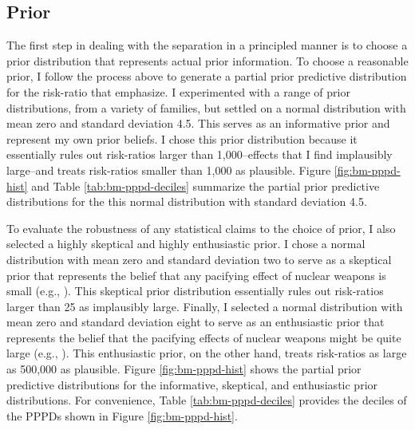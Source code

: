 \documentclass[12pt]{article}
\begin{document}
\subsection*{Prior}

The first step in dealing with the separation in a principled manner is to choose a prior distribution that represents actual prior information. 
To choose a reasonable prior, I follow the process above to generate a partial prior predictive distribution for the risk-ratio that \cite{BellMiller2015} emphasize. 
I experimented with a range of prior distributions, from a variety of families, but settled on a normal distribution with mean zero and standard deviation 4.5. 
This serves as an informative prior and represent my own prior beliefs.   
I chose this prior distribution because it essentially rules out risk-ratios larger than 1,000--effects that I find implausibly large--and treats risk-ratios smaller than 1,000 as plausible. 
Figure \ref{fig:bm-pppd-hist} and Table \ref{tab:bm-pppd-deciles} summarize the partial prior predictive distributions for the this normal distribution with standard deviation 4.5.

To evaluate the robustness of any statistical claims to the choice of prior, I also selected a highly skeptical and highly enthusiastic prior. 
I chose a normal distribution with mean zero and standard deviation two to serve as a skeptical prior that represents the belief that any pacifying effect of nuclear weapons is small (e.g., \citealt{Mueller1988}). 
This skeptical prior distribution essentially rules out risk-ratios larger than 25 as implausibly large. 
Finally, I selected a normal distribution with mean zero and standard deviation eight to serve as an enthusiastic prior that represents the belief that the pacifying effects of nuclear weapons might be quite large (e.g., \citealt{Mearsheimer1993}). 
This enthusiastic prior, on the other hand, treats risk-ratios as large as 500,000 as plausible. 
Figure \ref{fig:bm-pppd-hist} shows the partial prior predictive distributions for the informative, skeptical, and enthusiastic prior distributions. 
For convenience, Table \ref{tab:bm-pppd-deciles} provides the deciles of the PPPDs shown in Figure \ref{fig:bm-pppd-hist}. 
\end{document}
